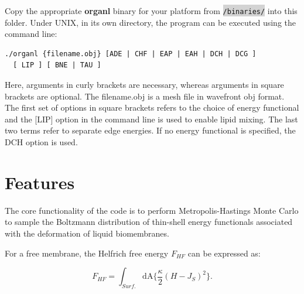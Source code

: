 \documentclass[11pt]{article}
\newcommand{\inlinecode}[1]{\colorbox{lightgray}{\lstinline[breaklines=true,basicstyle=\ttfamily]{#1}}}
\newcommand{\D}[1]{\mathrm{d#1}}
\begin{document}
Copy the appropriate \textbf{organl} binary for your platform from \inlinecode{/binaries/} into this folder. Under UNIX, in its own directory, the program can be executed using the command line:
\begin{mdframed}[backgroundcolor=lightgray, linecolor=lightgray]  %
\begin{verbatim}
./organl {filename.obj} [ADE | CHF | EAP | EAH | DCH | DCG ] 
  [ LIP ] [ BNE | TAU ]
\end{verbatim}


\end{mdframed}
Here, arguments in curly brackets are necessary, whereas arguments in square brackets are optional. The filename.obj is a mesh file in wavefront obj format. The first set of options in square brackets refers to the choice of energy functional and the [LIP] option in the command line is used to enable lipid mixing. The last two terms refer to separate edge energies.
If no energy functional is specified, the DCH option is used.
\section{Features}

The core functionality of the code is to perform Metropolis-Hastings Monte Carlo to sample the Boltzmann distribution of thin-shell energy functionals associated with the deformation of liquid biomembranes.

For a free membrane, the Helfrich free energy $F_{HF}$ can be expressed as:

 \begin{equation}
  F_{HF} = \int_{Surf.} \D{A}  \bigg\{ \frac{{\kappa}}{2} (H-J_S)^2 \bigg\}.
  \label{eq:helf}
 \end{equation}
 
\end{document}
